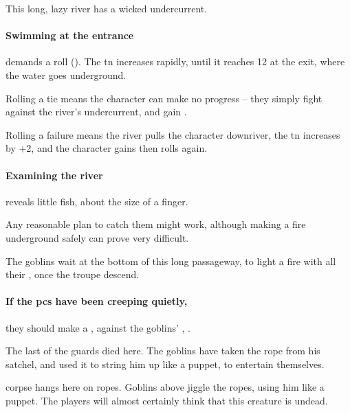 \begin{multicols}{2}

This long, lazy river has a wicked undercurrent.

\paragraph{Swimming at the entrance}
demands a  roll (\tn[5]).
The \gls{tn} increases rapidly, until it reaches 12 at the exit, where the water goes underground.

Rolling a tie means the character can make no progress -- they simply fight against the river's undercurrent, and gain .

Rolling a failure means the river pulls the character downriver, the \gls{tn} increases by +2, and the character gains  then rolls again.

\paragraph{Examining the river}
reveals little fish, about the size of a finger.

Any reasonable plan to catch them might work, although making a fire underground safely can prove very difficult.%


The goblins wait at the bottom of this long passageway, to light a fire with all their \fireFuel, once the troupe descend.

\goblin

\paragraph{If the \glspl{pc} have been creeping quietly,}
they should make a , against the goblins' , \tn.


\begin{exampletext}
  The last of the \glspl{guard} died here.
  The goblins have taken the rope from his satchel, and used it to string him up like a puppet, to entertain themselves.
\end{exampletext}

 corpse hangs here on ropes.
Goblins above jiggle the ropes, using him like a puppet.
The players will almost certainly think that this creature is undead.


\end{multicols}
